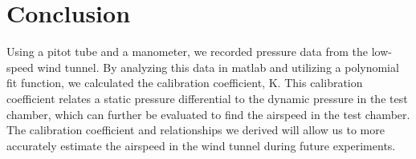 \chapter{Conclusion}
\label{cp:conclusion}

Using a pitot tube and a manometer, we recorded pressure data from the low-speed wind tunnel. By analyzing this data in \acrshort{matlab} and utilizing a polynomial fit function, we calculated the calibration coefficient, \gls{K}. This calibration coefficient relates a static pressure differential to the dynamic pressure in the test chamber, which can further be evaluated to find the airspeed in the test chamber. The calibration coefficient and relationships we derived will allow us to more accurately estimate the airspeed in the wind tunnel during future experiments.